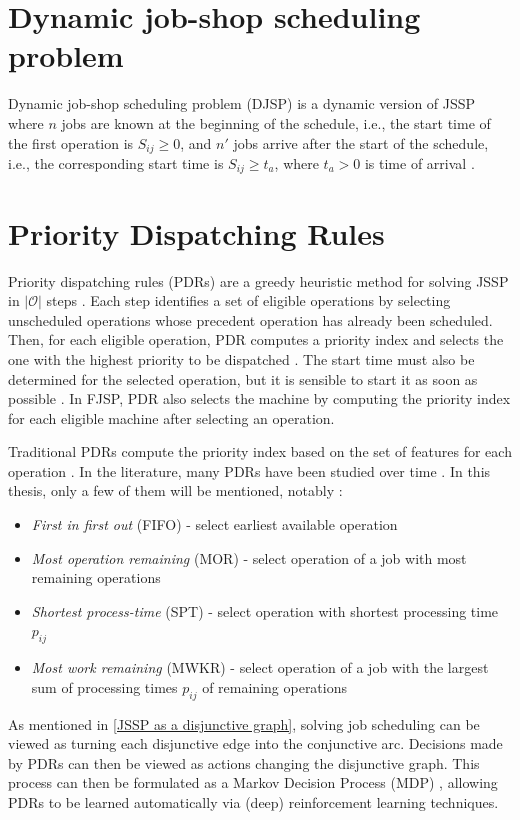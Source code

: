 \section{Dynamic job-shop scheduling problem}

Dynamic job-shop scheduling problem (DJSP) is a dynamic version of JSSP where $n$ jobs are known at the beginning of the schedule, i.e., the start time of the first operation is $S_{ij} \geq 0$, and $n'$ jobs arrive after the start of the schedule, i.e., the corresponding start time is $S_{ij} \geq t_a$, where $t_a > 0$ is time of arrival \cite{KUNDAKCI201631, Haupt_1989a}.

\section{Priority Dispatching Rules}
Priority dispatching rules (PDRs) are a greedy heuristic method for solving JSSP in $\left|\mathcal{O}\right|$ steps \cite{zhang2020learning}. Each step identifies a set of eligible operations by selecting unscheduled operations whose precedent operation has already been scheduled. Then, for each eligible operation, PDR computes a priority index and selects the one with the highest priority to be dispatched \cite{zhang2020learning}. The start time must also be determined for the selected operation, but it is sensible to start it as soon as possible \cite{discovering_dispatching_rules}. In FJSP, PDR also selects the machine by computing the priority index for each eligible machine after selecting an operation.
\par
Traditional PDRs compute the priority index based on the set of features for each operation \cite{Haupt_1989a}. In the literature, many PDRs have been studied over time \cite{7232991, discovering_dispatching_rules, doi:10.1080/00207543.2011.611539, Haupt_1989a}. In this thesis, only a few of them will be mentioned, notably \cite{Haupt_1989a, 10226873}:
\begin{itemize}
    \item \textit{First in first out} (FIFO) - select earliest available operation 
    \item \textit{Most operation remaining} (MOR) - select operation of a job with most remaining operations
    \item \textit{Shortest process-time} (SPT) - select operation with shortest processing time $p_{ij}$
    \item \textit{Most work remaining} (MWKR) - select operation of a job with the largest sum of processing times $p_{ij}$ of remaining operations
\end{itemize}
As mentioned in \ref{JSSP as a disjunctive graph}, solving job scheduling can be viewed as turning each disjunctive edge into the conjunctive arc. Decisions made by PDRs can then be viewed as actions changing the disjunctive graph. This process can then be formulated as a Markov Decision Process (MDP) \cite{zhang2020learning, jssp_rl_env}, allowing PDRs to be learned automatically via (deep) reinforcement learning techniques.

